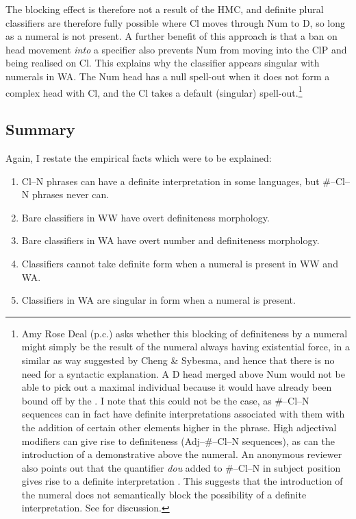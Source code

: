 \documentclass[output=paper
,modfonts
,nonflat]{langsci/langscibook}
\begin{document}
The blocking effect is therefore not a result of the HMC, and definite plural classifiers are therefore fully possible where Cl moves through Num to D, so long as a numeral is not present. A further benefit of this approach is that a ban on head movement \textit{into} a specifier also prevents Num from moving into the ClP and being realised on Cl. This explains why the classifier appears singular with numerals in WA. The Num head has a null spell-out when it does not form a complex head with Cl, and the Cl takes a default (singular) spell-out.{\footnote{Amy Rose Deal (p.c.) asks whether this blocking of definiteness by a numeral might simply be the result of the numeral always having existential force, in a similar as way suggested by Cheng \& Sybesma, and hence that there is no need for a syntactic explanation. A D head merged above Num would not be able to pick out a maximal individual because it would have already been bound off by the . I note that this could not be the case, as \#--Cl--N sequences can in fact have definite interpretations associated with them with the addition of certain other elements higher in the phrase. High adjectival modifiers can give rise to definiteness (Adj--\#--Cl--N sequences), as can the introduction of a demonstrative above the numeral. An anonymous reviewer also points out that the quantifier \textit{dou} added to \#--Cl--N in subject position gives rise to a definite interpretation \citep{Cheng2009}. This suggests that the introduction of the numeral does not semantically block the possibility of a definite interpretation. See \citet[\S4]{Hall2015} for discussion.}}

\subsection{Summary}

Again, I restate the empirical facts which were to be explained:

\begin{enumerate}
\item Cl--N phrases can have a definite interpretation in some languages, but \#--Cl--N phrases never can.
\item Bare classifiers in WW have overt definiteness morphology.
\item Bare classifiers in WA have overt number and definiteness morphology.
\item Classifiers cannot take definite form when a numeral is present in WW and WA.
\item Classifiers in WA are singular in form when a numeral is present.
\end{enumerate}
\end{document}
